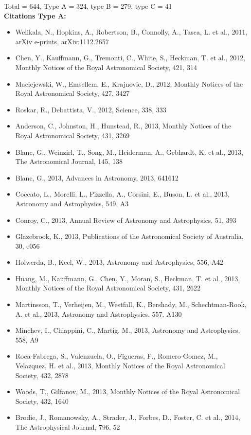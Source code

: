 \documentclass{letter}
\begin{document}
\begin{enumerate}
Total = 644, Type A = 324, type B = 279, type C = 41 \\ 
{\bf Citations Type A:}
\begin{itemize}
\item Welikala, N., Hopkins, A., Robertson, B., Connolly, A., Tasca, L. et al., 2011, arXiv e-prints, arXiv:1112.2657
\item Chen, Y., Kauffmann, G., Tremonti, C., White, S., Heckman, T. et al., 2012, Monthly Notices of the Royal Astronomical Society, 421, 314
\item Maciejewski, W., Emsellem, E., Krajnovic, D., 2012, Monthly Notices of the Royal Astronomical Society, 427, 3427
\item Roskar, R., Debattista, V., 2012, Science, 338, 333
\item Anderson, C., Johnston, H., Hunstead, R., 2013, Monthly Notices of the Royal Astronomical Society, 431, 3269
\item Blanc, G., Weinzirl, T., Song, M., Heiderman, A., Gebhardt, K. et al., 2013, The Astronomical Journal, 145, 138
\item Blanc, G., 2013, Advances in Astronomy, 2013, 641612
\item Coccato, L., Morelli, L., Pizzella, A., Corsini, E., Buson, L. et al., 2013, Astronomy and Astrophysics, 549, A3
\item Conroy, C., 2013, Annual Review of Astronomy and Astrophysics, 51, 393
\item Glazebrook, K., 2013, Publications of the Astronomical Society of Australia, 30, e056
\item Holwerda, B., Keel, W., 2013, Astronomy and Astrophysics, 556, A42
\item Huang, M., Kauffmann, G., Chen, Y., Moran, S., Heckman, T. et al., 2013, Monthly Notices of the Royal Astronomical Society, 431, 2622
\item Martinsson, T., Verheijen, M., Westfall, K., Bershady, M., Schechtman-Rook, A. et al., 2013, Astronomy and Astrophysics, 557, A130
\item Minchev, I., Chiappini, C., Martig, M., 2013, Astronomy and Astrophysics, 558, A9
\item Roca-Fabrega, S., Valenzuela, O., Figueras, F., Romero-Gomez, M., Velazquez, H. et al., 2013, Monthly Notices of the Royal Astronomical Society, 432, 2878
\item Woods, T., Gilfanov, M., 2013, Monthly Notices of the Royal Astronomical Society, 432, 1640
\item Brodie, J., Romanowsky, A., Strader, J., Forbes, D., Foster, C. et al., 2014, The Astrophysical Journal, 796, 52

\end{itemize}
\end{enumerate}
\end{document}
